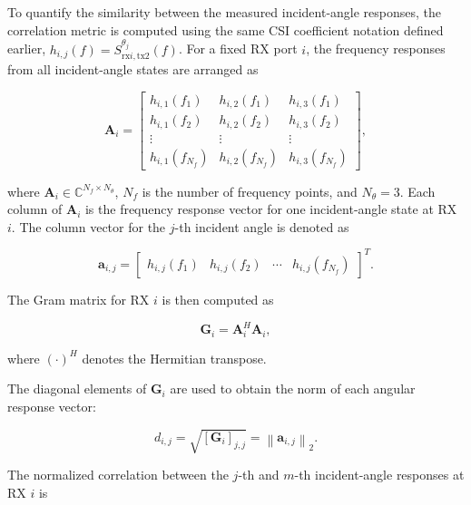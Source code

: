 \documentclass[10pt]{article}
\begin{document}
To quantify the similarity between the measured incident-angle responses, the correlation metric is
computed using the same CSI coefficient notation defined earlier,
\(h_{i,j}(f)=S_{\mathrm{rx}i,\mathrm{tx2}}^{\theta_j}(f)\). For a fixed RX port \(i\), the
frequency responses from all incident-angle states are arranged as

\begin{equation}
\mathbf{A}_{i}
=
\begin{bmatrix}
h_{i,1}(f_1) & h_{i,2}(f_1) & h_{i,3}(f_1)\\
h_{i,1}(f_2) & h_{i,2}(f_2) & h_{i,3}(f_2)\\
\vdots & \vdots & \vdots\\
h_{i,1}(f_{N_f}) & h_{i,2}(f_{N_f}) & h_{i,3}(f_{N_f})
\end{bmatrix},
\label{eq:Hang_corr}
\end{equation}

where \(\mathbf{A}_{i}\in\mathbb{C}^{N_f\times N_{\theta}}\), \(N_f\) is the number of frequency
points, and \(N_{\theta}=3\). Each column of \(\mathbf{A}_i\) is the frequency response vector for
one incident-angle state at RX \(i\). The column vector for the \(j\)-th incident angle is denoted as

\begin{equation}
\mathbf{a}_{i,j}
=
\begin{bmatrix}
h_{i,j}(f_1) &
h_{i,j}(f_2) &
\cdots &
h_{i,j}(f_{N_f})
\end{bmatrix}^{T}.
\label{eq:angular_response_vector_corr}
\end{equation}

The Gram matrix for RX \(i\) is then computed as

\begin{equation}
\mathbf{G}_{i}
=
\mathbf{A}_{i}^{H}
\mathbf{A}_{i},
\label{eq:gram_corr}
\end{equation}

where \((\cdot)^H\) denotes the Hermitian transpose.

The diagonal elements of \(\mathbf{G}_{i}\) are used to obtain the norm of each angular response
vector:

\begin{equation}
d_{i,j}
=
\sqrt{\left[\mathbf{G}_{i}\right]_{j,j}}
=
\left\|\mathbf{a}_{i,j}\right\|_2.
\label{eq:d_corr}
\end{equation}

The normalized correlation between the \(j\)-th and \(m\)-th incident-angle responses at RX \(i\) is
\end{document}
